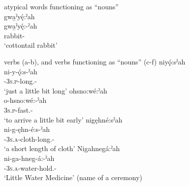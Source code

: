 \ea\label{ex:ahex} atypical words functioning as “nouns”\\
gwa̱ˀyę́:ˀah\\\label{ex:ahexa}
\gll gwa̱ˀyę́:-ˀah\\
 rabbit-{\diminutive}\\
\glt `cottontail rabbit'
\z


\ea\label{ex:ahex7} verbs (a-b), and verbs functioning as “nouns” (c-f)
\ea niyǫ́:sˀah\\ \label{ex:ahex7a}
\gll ni-y-ǫ́:s-ˀah\\
 {\partitive}-\textsc{3s.p}-long.{\stative}-{\diminutive}\\
\glt `just a little bit long'
\ex ohsno:wé:ˀah \\
\gll o-hsno:wé:-ˀah\\
 \textsc{3s.p}-fast.{\stative}-{\diminutive}\\
\glt `to arrive a little bit early'
\ex nigęhné:sˀah\\ \label{ex:ahex7c}
\gll ni-g-ęhn-é:s-ˀah\\
 {\partitive}-\textsc{3s.a}-cloth-long.{\stative}-{\diminutive}\\
\glt `a short length of cloth'
\ex Nigahnegá:ˀah\\
\gll ni-ga-hneg-á:-ˀah\\
 {\partitive}-\textsc{3s.a}-water-hold.{\stative}-{\diminutive}\\
\glt `Little Water Medicine' (name of a ceremony)

